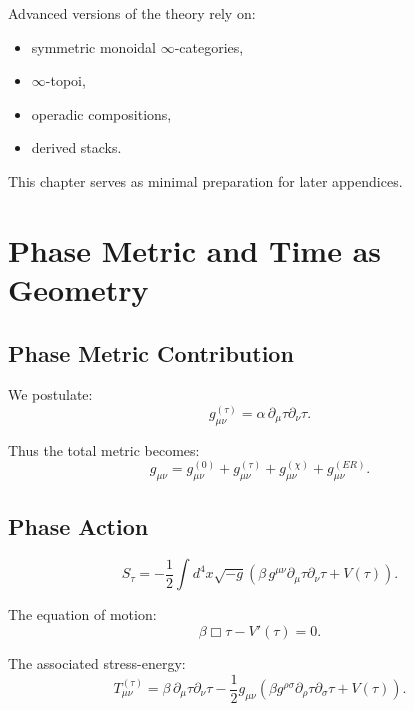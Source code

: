 Advanced versions of the theory rely on:

\begin{itemize}
  \item symmetric monoidal $\infty$-categories,
  \item $\infty$-topoi,
  \item operadic compositions,
  \item derived stacks.
\end{itemize}

This chapter serves as minimal preparation for later appendices.


\chapter{Phase Metric and Time as Geometry}

\section{Phase Metric Contribution}

We postulate:
\[
g^{(\tau)}_{\mu\nu}
=
\alpha\, \partial_\mu \tau \partial_\nu \tau.
\]

Thus the total metric becomes:
\[
g_{\mu\nu} 
= 
g^{(0)}_{\mu\nu}
+ g^{(\tau)}_{\mu\nu}
+ g^{(\chi)}_{\mu\nu}
+ g^{(ER)}_{\mu\nu}.
\]

\section{Phase Action}

\[
S_\tau
=
-\frac{1}{2}\int d^4x \sqrt{-g}\left(
\beta\, g^{\mu\nu}\partial_\mu\tau\partial_\nu\tau
+ V(\tau)
\right).
\]

The equation of motion:
\[
\beta \Box \tau - V'(\tau) = 0.
\]

The associated stress-energy:
\[
T^{(\tau)}_{\mu\nu}
=
\beta\, \partial_\mu\tau\partial_\nu\tau
-\frac{1}{2}g_{\mu\nu}
\left(
\beta g^{\rho\sigma}\partial_\rho\tau\partial_\sigma\tau
+ V(\tau)
\right).
\]


